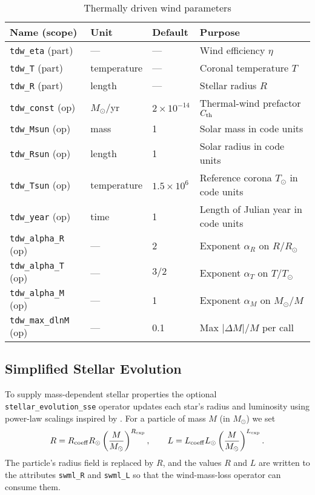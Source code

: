 \documentclass[11pt]{article}
\begin{document}
\begin{table}[h]
\centering\footnotesize
\caption{Thermally driven wind parameters}
\label{tab:tdw}
\begin{tabular}{@{}llll@{}}
\toprule
Name (scope) & Unit & Default & Purpose \\
\midrule
\texttt{tdw\_eta} (part) & — & — & Wind efficiency $\eta$\\
\texttt{tdw\_T}   (part) & temperature & — & Coronal temperature $T$\\
\texttt{tdw\_R}   (part) & length & — & Stellar radius $R$\\[0.2em]
\texttt{tdw\_const} (op) & $M_\odot$/yr & $2\times10^{-14}$ & Thermal-wind prefactor $C_{\rm th}$\\
\texttt{tdw\_Msun}  (op) & mass & 1 & Solar mass in code units\\
\texttt{tdw\_Rsun}  (op) & length & 1 & Solar radius in code units\\
\texttt{tdw\_Tsun}  (op) & temperature & $1.5\times10^6$ & Reference corona $T_\odot$ in code units\\
\texttt{tdw\_year}  (op) & time & 1 & Length of Julian year in code units\\
\texttt{tdw\_alpha\_R} (op) & — & 2 & Exponent $\alpha_R$ on $R/R_\odot$\\
\texttt{tdw\_alpha\_T} (op) & — & $3/2$ & Exponent $\alpha_T$ on $T/T_\odot$\\
\texttt{tdw\_alpha\_M} (op) & — & 1 & Exponent $\alpha_M$ on $M_\odot/M$\\
\texttt{tdw\_max\_dlnM} (op) & — & 0.1 & Max $|\Delta M|/M$ per call\\
\bottomrule
\end{tabular}
\end{table}

\subsection{Simplified Stellar Evolution}
\label{sec:sse}

To supply mass-dependent stellar properties the optional
\texttt{stellar\_evolution\_sse} operator updates each star's radius and
luminosity using power-law scalings inspired by \citet{Hurley2000}. For a
particle of mass $M$ (in $M_\odot$) we set
\[
R = R_{\rm coeff} R_\odot \left(\frac{M}{M_\odot}\right)^{R_{\rm exp}},\qquad
L = L_{\rm coeff} L_\odot \left(\frac{M}{M_\odot}\right)^{L_{\rm exp}}.
\]
The particle's radius field is replaced by $R$, and the values $R$ and $L$
are written to the attributes \texttt{swml\_R} and \texttt{swml\_L} so that
the wind-mass-loss operator can consume them.
\end{document}
